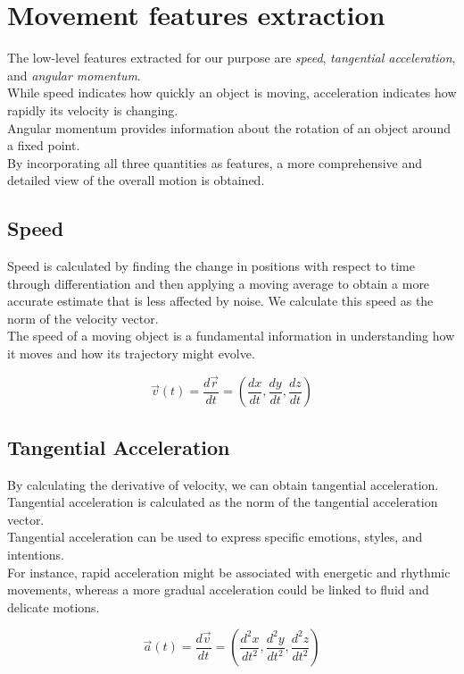 \section{Movement features extraction}
The low-level features extracted for our purpose are \textit{speed}, \textit{tangential acceleration}, and \textit{angular momentum}. \\
While speed indicates how quickly an object is moving, acceleration indicates how rapidly its velocity is changing.\\
Angular momentum provides information about the rotation of an object around a fixed point.\\
By incorporating all three quantities as features, a more comprehensive and detailed view of the overall motion is obtained.

\subsection{Speed}
Speed is calculated by finding the change in positions with respect to time through differentiation and then applying a moving average to obtain a more accurate estimate that is less affected by noise.
We calculate this speed as the norm of the velocity vector. \\
The speed of a moving object is a fundamental information in understanding how it moves and how its trajectory might evolve.

\begin{equation}
  \vec{v}(t) = \frac{d\vec{r}}{dt} = \left(\frac{dx}{dt}, \frac{dy}{dt}, \frac{dz}{dt}\right)
\end{equation}

\subsection{Tangential Acceleration}
By calculating the derivative of velocity, we can obtain tangential acceleration.
Tangential acceleration is calculated as the norm of the tangential acceleration vector. \\
Tangential acceleration can be used to express specific emotions, styles, and intentions. \\
For instance, rapid acceleration might be associated with energetic and rhythmic movements, whereas a more gradual acceleration could be linked to fluid and delicate motions.

\begin{equation}
  \vec{a}(t) = \frac{d\vec{v}}{dt} = \left(\frac{d^2x}{dt^2}, \frac{d^2y}{dt^2}, \frac{d^2z}{dt^2}\right)
\end{equation}


